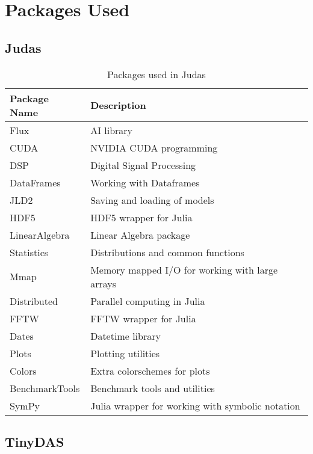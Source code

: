 
\chapter{Packages Used}
\label{app:packages}

\section{Judas}
\label{app:jupacks}

\begin{table}[!htbp]
\centering
\caption{Packages used in Judas}
\label{tab:judas-packages}
\small
\begin{tabular}{>{\raggedright\arraybackslash}p{}>{\raggedright\arraybackslash}p{}}
\toprule
\textbf{Package Name} & \textbf{Description} \\
\midrule
\rowcolor{gray!10} Flux & AI library \\
CUDA & NVIDIA CUDA programming \\
\rowcolor{gray!10} DSP & Digital Signal Processing \\
DataFrames & Working with Dataframes \\
\rowcolor{gray!10} JLD2 & Saving and loading of models \\
HDF5 & HDF5 wrapper for Julia \\
\rowcolor{gray!10} LinearAlgebra & Linear Algebra package \\
Statistics & Distributions and common functions \\
\rowcolor{gray!10} Mmap & Memory mapped I/O for working with large arrays \\
Distributed & Parallel computing in Julia \\
\rowcolor{gray!10} FFTW & FFTW wrapper for Julia \\
Dates & Datetime library \\
\rowcolor{gray!10} Plots & Plotting utilities \\
Colors & Extra colorschemes for plots \\
\rowcolor{gray!10} BenchmarkTools & Benchmark tools and utilities \\
SymPy & Julia wrapper for working with symbolic notation \\
\bottomrule
\end{tabular}
\end{table}

\section{TinyDAS}
\label{app:tinypacks}

